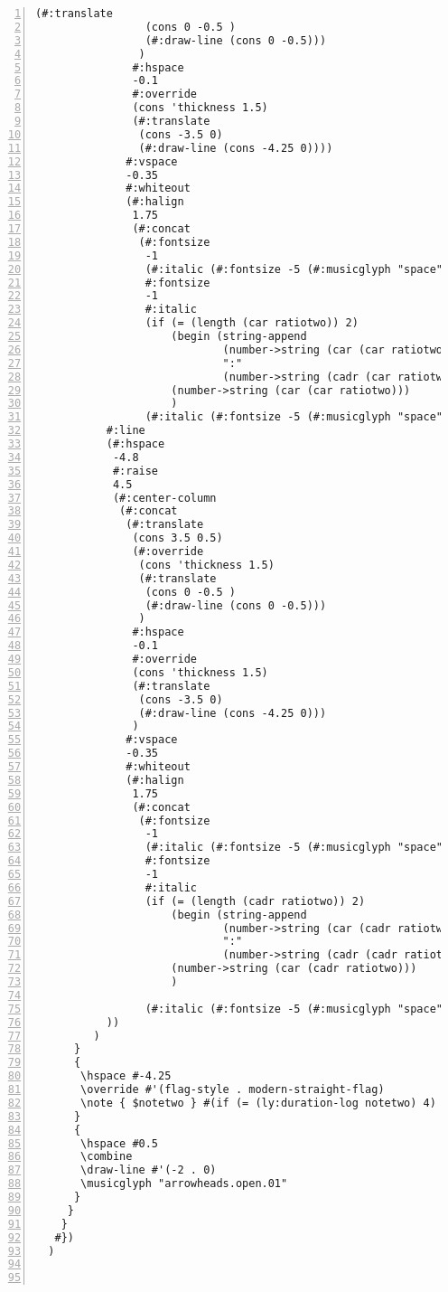 \begin{Verbatim}[numbers=left,xleftmargin=5mm]
                (#:translate
                 (cons 0 -0.5 )
                 (#:draw-line (cons 0 -0.5)))
                )
               #:hspace
               -0.1
               #:override
               (cons 'thickness 1.5)
               (#:translate
                (cons -3.5 0)
                (#:draw-line (cons -4.25 0))))
              #:vspace
              -0.35
              #:whiteout
              (#:halign
               1.75
               (#:concat
                (#:fontsize
                 -1
                 (#:italic (#:fontsize -5 (#:musicglyph "space")))
                 #:fontsize
                 -1
                 #:italic
                 (if (= (length (car ratiotwo)) 2)
                     (begin (string-append
                             (number->string (car (car ratiotwo)))
                             ":"
                             (number->string (cadr (car ratiotwo))))  )
                     (number->string (car (car ratiotwo)))
                     )
                 (#:italic (#:fontsize -5 (#:musicglyph "space")))))))))
           #:line
           (#:hspace
            -4.8
            #:raise
            4.5
            (#:center-column
             (#:concat
              (#:translate
               (cons 3.5 0.5)
               (#:override
                (cons 'thickness 1.5)
                (#:translate
                 (cons 0 -0.5 )
                 (#:draw-line (cons 0 -0.5)))
                )
               #:hspace
               -0.1
               #:override
               (cons 'thickness 1.5)
               (#:translate
                (cons -3.5 0)
                (#:draw-line (cons -4.25 0)))
               )
              #:vspace
              -0.35
              #:whiteout
              (#:halign
               1.75
               (#:concat
                (#:fontsize
                 -1
                 (#:italic (#:fontsize -5 (#:musicglyph "space")))
                 #:fontsize
                 -1
                 #:italic
                 (if (= (length (cadr ratiotwo)) 2)
                     (begin (string-append
                             (number->string (car (cadr ratiotwo)))
                             ":"
                             (number->string (cadr (cadr ratiotwo)))))
                     (number->string (car (cadr ratiotwo)))
                     )

                 (#:italic (#:fontsize -5 (#:musicglyph "space")))))))))
           ))
         )
      }
      {
       \hspace #-4.25
       \override #'(flag-style . modern-straight-flag)
       \note { $notetwo } #(if (= (ly:duration-log notetwo) 4) 1 1 )
      }
      {
       \hspace #0.5
       \combine
       \draw-line #'(-2 . 0)
       \musicglyph "arrowheads.open.01"
      }
     }
    }
   #})
  )



\end{Verbatim}
